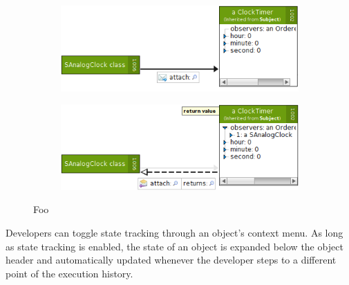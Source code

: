 \begin{figure}[b]
	\centering
	
	\begin{subfigure}{0.45\textwidth}
		\centering
		\includegraphics[width=\textwidth]{../images/04-ImplExplorationState1}
		\caption[Foo]{}
		\label{fig:ImplementationExplorationState1}
	\end{subfigure}
	\quad
	\begin{subfigure}{0.45\textwidth}
		\centering
		\includegraphics[width=\textwidth]{../images/04-ImplExplorationState2}
		\caption[Foo]{}
		\label{fig:ImplementationExplorationState2}
	\end{subfigure}
	
	\caption[Foo]{Foo}
	\label{fig:ImplementationExplorationState}
\end{figure}

Developers can toggle state tracking through an object's context menu.
As long as state tracking is enabled, the state of an object is expanded below the object header and automatically updated whenever the developer steps to a different point of the execution history.


